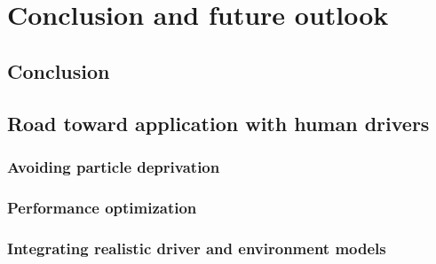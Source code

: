 \chapter{Conclusion and future outlook}
\label{sec:conclusion}

\section{Conclusion}



% 

\section{Road toward application with human drivers}
\subsection{Avoiding particle deprivation}

\subsection{Performance optimization}
\label{sec:perf_opt}




\subsection{Integrating realistic driver and environment models}
